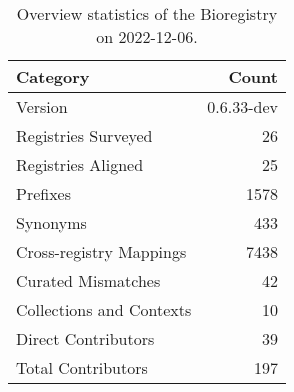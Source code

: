 \begin{table}
\centering
\caption{Overview statistics of the Bioregistry on 2022-12-06.}
\label{tab:bioregistry-summary}
\begin{tabular}{lr}
\toprule
                Category &      Count \\
\midrule
                 Version & 0.6.33-dev \\
     Registries Surveyed &         26 \\
      Registries Aligned &         25 \\
                Prefixes &       1578 \\
                Synonyms &        433 \\
 Cross-registry Mappings &       7438 \\
      Curated Mismatches &         42 \\
Collections and Contexts &         10 \\
     Direct Contributors &         39 \\
      Total Contributors &        197 \\
\bottomrule
\end{tabular}
\end{table}
